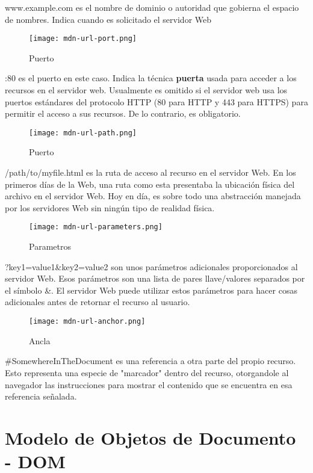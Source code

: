 www.example.com es el nombre de dominio o autoridad que gobierna el espacio de nombres. Indica cuando es solicitado el servidor Web

\begin{figure}[H]
	\center
	\texttt{[image: mdn-url-port.png]}
	\caption{Puerto}
\end{figure}

:80 es el puerto en este caso. Indica la técnica \textbf{puerta} usada para acceder a los recursos en el servidor web. Usualmente es omitido si el servidor web usa los puertos estándares del protocolo HTTP (80 para HTTP y 443 para HTTPS) para permitir el acceso a sus recursos. De lo contrario, es obligatorio.

\begin{figure}[H]
	\center
	\texttt{[image: mdn-url-path.png]}
	\caption{Puerto}
\end{figure}

/path/to/myfile.html es la ruta de acceso al recurso en el servidor Web. En los primeros días de la Web, una ruta como esta presentaba la ubicación física del archivo en el servidor Web. Hoy en día, es sobre todo una abstracción manejada por los servidores Web sin ningún tipo de realidad física.

\begin{figure}[H]
	\center
	\texttt{[image: mdn-url-parameters.png]}
	\caption{Parametros}
\end{figure}

?key1=value1\&key2=value2 son unos parámetros adicionales proporcionados al servidor Web. Esos parámetros son una lista de pares llave/valores separados por el símbolo \&. El servidor Web puede utilizar estos parámetros para hacer cosas adicionales antes de retornar el recurso al usuario. 

\begin{figure}[H]
	\center
	\texttt{[image: mdn-url-anchor.png]}
	\caption{Ancla}
\end{figure}

\#SomewhereInTheDocument es una referencia a otra parte del propio recurso. Esto representa una especie de "marcador" dentro del recurso, otorgandole al navegador las instrucciones para mostrar el contenido que se encuentra en esa referencia señalada. 

\section{Modelo de Objetos de Documento - DOM}

